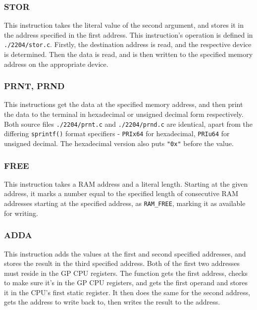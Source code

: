 \documentclass[a4paper,11pt]{article}
\begin{document}
        \subsubsection{STOR}
            This instruction takes the literal value of the second argument, and stores it in the address specified in the first address. This instruction's operation is defined in \lstinline{./2204/stor.c}. Firstly, the destination address is read, and the respective device is determined. Then the data is read, and is then written to the specified memory address on the appropriate device.
            
        \subsubsection{PRNT, PRND}
            This instructions get the data at the specified memory address, and then print the data to the terminal in hexadecimal or unsigned decimal form respectively. Both source files \lstinline{./2204/prnt.c} and \lstinline{./2204/prnd.c} are identical, apart from the differing \lstinline{sprintf()} format specifiers - \lstinline{PRIx64} for hexadecimal, \lstinline{PRIu64} for unsigned decimal. The hexadecimal version also puts \lstinline{"0x"} before the value.
            
        \subsubsection{FREE}
            This instruction takes a RAM address and a literal length. Starting at the given address, it marks a number equal to the specified length of consecutive RAM addresses starting at the specified address, as \lstinline{RAM_FREE}, marking it as available for writing.
            
        \subsubsection{ADDA}
            This instruction adds the values at the first and second specified addresses, and stores the result in the third specified address. Both of the first two addresses must reside in the GP CPU registers. The function gets the first address, checks to make sure it's in the GP CPU registers, and gets the first operand and stores it in the CPU's first static register. It then does the same for the second address, gets the address to write back to, then writes the result to the address.
            
\end{document}
